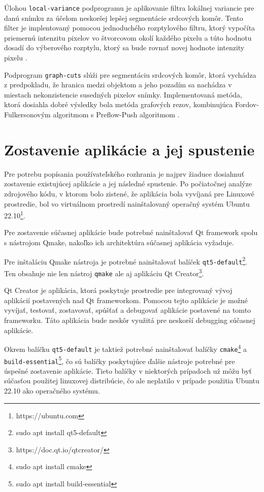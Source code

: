 Úlohou \texttt{local-variance} podprogramu je aplikovanie filtra lokálnej variancie pre danú snímku za účelom neskoršej lepšej segmentácie srdcových komôr. Tento filter je implentovaný pomocou jednoduchého rozptylového filtru, ktorý vypočíta priemernú intenzitu pixelov vo štvorcovom okolí každého pixelu a túto hodnotu dosadí do výberového rozptylu, ktorý sa bude rovnať novej hodnote intenzity pixelu \cite{master_thesis_app}.

Podprogram \texttt{graph-cuts} slúži pre segmentáciu srdcových komôr, ktorá vychádza z predpokladu, že hranica medzi objektom a jeho pozadím sa nachádza v miestach nekonzistencie susedných pixelov snímky. Implementovaná metóda, ktorá dosiahla dobré výsledky bola metóda grafových rezov, kombinujúca Fordov-Fulkersonovým algoritmom s Preflow-Push algoritmom \cite{master_thesis_app}.

\section {Zostavenie aplikácie a jej spustenie}
Pre potrebu popísania používateľského rozhrania je najprv žiaduce dosiahnuť zostavenie existujúcej aplikácie a jej následné spustenie. Po počiatočnej analýze zdrojového kódu, v ktorom bolo zistené, že aplikácia bola vyvíjaná pre Linuxové prostredie, bol vo virtuálnom prostredí nainštalovaný operačný systém Ubuntu 22.10\footnote{https://ubuntu.com}.

Pre zostavenie súčasnej aplikácie bude potrebné nainštalovať Qt framework spolu s nástrojom Qmake, nakoľko ich architektúra súčasnej aplikácia vyžaduje.

Pre inštaláciu Qmake nástroja je potrebné nainštalovať balíček \texttt{qt5-default}\footnote{sudo apt install qt5-default}. Ten obsahuje nie len nástroj \texttt{qmake} ale aj aplikáciu Qt Creator\footnote{https://doc.qt.io/qtcreator/}.

Qt Creator je aplikácia, ktorá poskytuje prostredie pre integrovaný vývoj aplikácií postavených nad Qt frameworkom. Pomocou tejto aplikácie je možné vyvíjať, testovať, zostavovať, spúšťať a debugovať aplikácie postavené na tomto frameworku. Táto aplikácia bude neskôr využitá pre neskorší debugging súčasnej aplikácie.

Okrem balíčku \texttt{qt5-default} je taktiež potrebné nainštalovať balíčky \texttt{cmake}\footnote{sudo apt install cmake} a \texttt{build-essential}\footnote{sudo apt install build-essential}, čo sú balíčky poskytujúce ďalšie nástroje potrebné pre úspešné zostavenie aplikácie. Tieto balíčky v niektorých prípadoch už môžu byť súčasťou použitej linuxovej distribúcie, čo ale neplatilo v prípade použitia Ubuntu 22.10 ako operačného systému.

